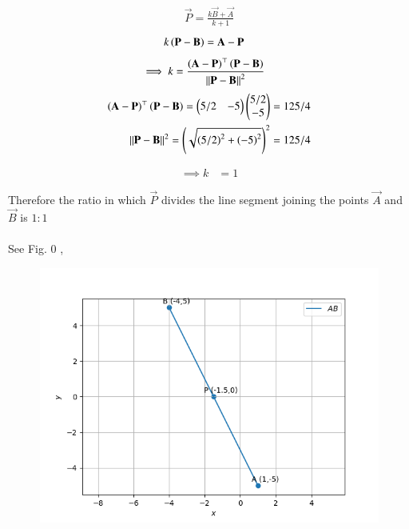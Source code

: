 \documentclass[journal]{IEEEtran}
\begin{document}
\begin{align}
    \vec{P}=\frac{k\vec{B}+\vec{A}}{k+1}
\end{align}
\begin{align}
			k\left(\mathbf{P}-\mathbf{B}\right)&= \mathbf{A}-\mathbf{P}
\end{align}
\begin{align}
    \implies k &=
			\frac{\left(\mathbf{A}-\mathbf{P}\right)^{\top}\left(\mathbf{P}-\mathbf{B}\right)}{\left\lVert\mathbf{P}-\mathbf{B}\right\rVert^2}
\end{align}
\bigskip
\begin{align}
\left(\mathbf{A}-\mathbf{P}\right)^{\top}\left(\mathbf{P}-\mathbf{B}\right) = \begin{pmatrix}5/2 & -5\end{pmatrix}\begin{pmatrix}5/2\\-5\end{pmatrix} = 125/4\\
{\left\lVert\mathbf{P}-\mathbf{B}\right\rVert^2} = \left(\sqrt{\left(5/2\right)^2 + \left(-5\right)^2}\right)^2 = 125/4
\end{align}

\begin{align}
\implies k &= 1
\end{align}

Therefore the ratio in which $\vec{P}$ divides the line segment joining the points $\vec{A}$ and $\vec{B}$ is $1:1$\\
\\
See Fig. 0 ,
\begin{figure}[H]
\begin{center}
\includegraphics[width=0.6\columnwidth]{figs/fig.png}
\end{center}
\caption{}
\label{fig:Fig1}
\end{figure}
\end{document}
